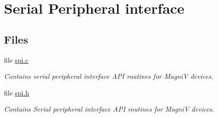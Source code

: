 \hypertarget{group___s_p_i}{}\section{Serial Peripheral interface}
\label{group___s_p_i}
\subsection*{Files}
\begin{DoxyCompactItemize}
\item 
file \hyperlink{spi_8c}{spi.\+c}
\begin{DoxyCompactList}\small\item\em Contains serial peripheral interface A\+P\+I routines for Magni\+V devices. \end{DoxyCompactList}\item 
file \hyperlink{spi_8h}{spi.\+h}
\begin{DoxyCompactList}\small\item\em Contains Serial peripheral interface A\+P\+I routines for Magni\+V devices. \end{DoxyCompactList}\end{DoxyCompactItemize}
